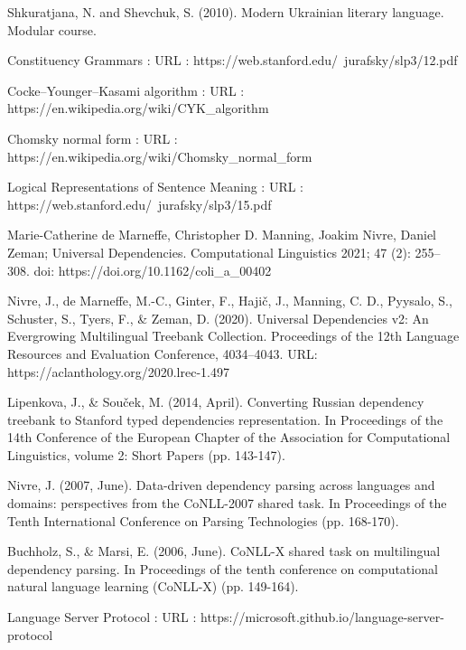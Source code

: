 \begin{thebibliography}{99}
\pagestyle{empty}

{}

Shkuratjana, N. and Shevchuk, S. (2010). Modern Ukrainian literary language. Modular course.

Constituency Grammars : URL :
https://web.stanford.edu/~jurafsky/slp3/12.pdf

Cocke–Younger–Kasami algorithm : URL :
https://en.wikipedia.org/wiki/CYK\_algorithm

Chomsky normal form : URL : \\
https://en.wikipedia.org/wiki/Chomsky\_normal\_form

Logical Representations of Sentence Meaning : URL :
https://web.stanford.edu/~jurafsky/slp3/15.pdf

Marie-Catherine de Marneffe, Christopher D. Manning, Joakim Nivre, Daniel Zeman;
Universal Dependencies. Computational Linguistics 2021; 47 (2): 255–308. doi:
https://doi.org/10.1162/coli\_a\_00402

Nivre, J., de Marneffe, M.-C., Ginter, F., Hajič, J., Manning, C. D., Pyysalo, S., Schuster, S., Tyers, F., \& Zeman, D. (2020). Universal Dependencies v2: An Evergrowing Multilingual Treebank Collection. Proceedings of the 12th Language Resources and Evaluation Conference, 4034–4043. URL: https://aclanthology.org/2020.lrec-1.497

Lipenkova, J., \& Souček, M. (2014, April). Converting Russian dependency treebank to Stanford typed dependencies representation. In Proceedings of the 14th Conference of the European Chapter of the Association for Computational Linguistics, volume 2: Short Papers (pp. 143-147).

Nivre, J. (2007, June). Data-driven dependency parsing across languages and domains: perspectives from the CoNLL-2007 shared task. In Proceedings of the Tenth International Conference on Parsing Technologies (pp. 168-170).

Buchholz, S., \& Marsi, E. (2006, June). CoNLL-X shared task on multilingual dependency parsing. In Proceedings of the tenth conference on computational natural language learning (CoNLL-X) (pp. 149-164).

Language Server Protocol : URL :
https://microsoft.github.io/language-server-protocol


\end{thebibliography}
